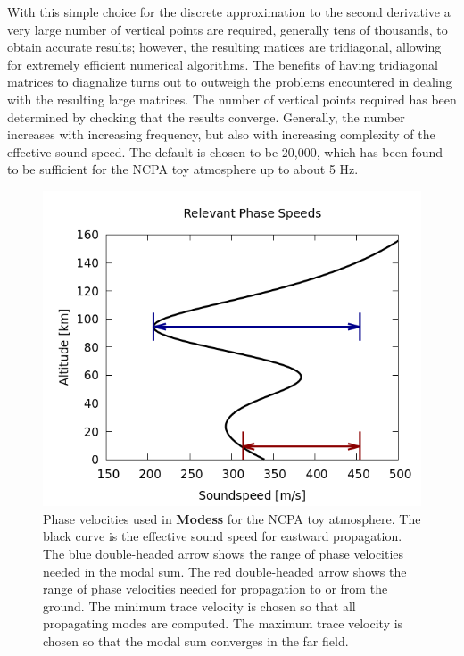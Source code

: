 With this simple choice for the discrete approximation to the second derivative a very large number of vertical points are required, generally tens of thousands, to obtain accurate results; however, the resulting matices are tridiagonal, allowing for extremely efficient numerical algorithms. The benefits of having tridiagonal matrices to diagnalize turns out to outweigh the problems encountered in dealing with the resulting large matrices. The number of vertical points required has been determined by checking that the results converge. Generally, the number increases with increasing frequency, but also with increasing complexity of the effective sound speed. The default is chosen to be 20,000, which has been found to be sufficient for the NCPA toy atmosphere up to about 5 Hz. 

\begin{figure}
\begin{center}
\includegraphics[scale=0.6]{figs/wvnums_modess}
\end{center}
\caption{Phase velocities used in {\bf Modess} for the NCPA toy atmosphere. The black curve is the effective sound speed for eastward propagation. The blue double-headed arrow shows the range of phase velocities needed in the modal sum. The red double-headed arrow shows the range of phase velocities needed for propagation to or from the ground. The minimum trace velocity is chosen so that all propagating modes are computed. The maximum trace velocity is chosen so that the modal sum converges in the far field. }
\label{fig:wvnums_modess}
\end{figure}

